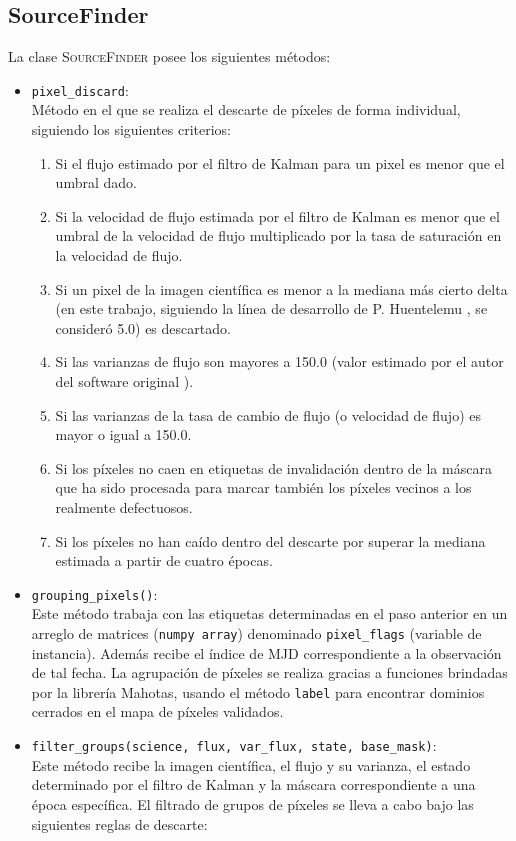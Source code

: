 \subsection{SourceFinder}
La clase \textsc{SourceFinder} posee los siguientes m\'etodos:
\begin{itemize}
\item \texttt{pixel\_discard}:\\
M\'etodo en el que se realiza el descarte de p\'ixeles de forma individual, siguiendo los siguientes criterios:
\begin{enumerate}
\item Si el flujo estimado por el filtro de Kalman para un pixel es menor que el umbral dado.
\item Si la velocidad de flujo estimada por el filtro de Kalman es menor que el umbral  de la velocidad de flujo multiplicado por la tasa de saturaci\'on en la velocidad de flujo.
\item Si un pixel de la imagen cient\'ifica es menor a la mediana m\'as cierto delta (en este trabajo, siguiendo la l\'inea de desarrollo de P. Huentelemu \cite{huentelemu}, se consider\'o 5.0) es descartado.
\item Si las varianzas de flujo son mayores a 150.0 (valor estimado por el autor del software original \cite{huentelemu}).
\item Si las varianzas de la tasa de cambio de flujo (o velocidad de flujo) es mayor o igual a 150.0.
\item Si los p\'ixeles no caen en etiquetas de invalidaci\'on dentro de la m\'ascara que ha sido procesada para marcar tambi\'en los p\'ixeles vecinos a los realmente defectuosos.
\item Si los p\'ixeles no han ca\'ido dentro del descarte por superar la mediana estimada a partir de cuatro \'epocas. 
\end{enumerate}
\item \texttt{grouping\_pixels()}:\\
Este m\'etodo trabaja con las etiquetas determinadas en el paso anterior en un arreglo de matrices (\texttt{numpy array}) denominado \texttt{pixel\_flags} (variable de instancia). Adem\'as recibe el \'indice de MJD correspondiente a la observaci\'on de tal fecha.
La agrupaci\'on de p\'ixeles se realiza gracias a funciones brindadas por la librer\'ia \textsf{Mahotas}, usando el m\'etodo \texttt{label} para encontrar dominios cerrados en el mapa de p\'ixeles validados.
\bigskip

\item \texttt{filter\_groups(science, flux, var\_flux, state, base\_mask)}:\\
Este m\'etodo recibe la imagen cient\'ifica, el flujo y su varianza, el estado determinado por el filtro de Kalman y la m\'ascara correspondiente a una \'epoca espec\'ifica. 
El filtrado de grupos de p\'ixeles se lleva a cabo bajo las siguientes reglas de descarte: 


\end{itemize}
